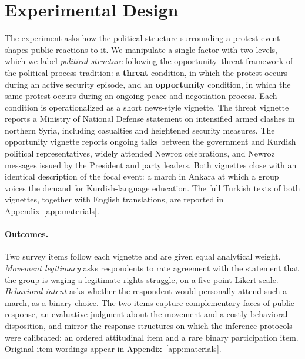 
\section{Experimental Design}
\label{sec:experiment}

The experiment asks how the political structure surrounding a protest event
shapes public reactions to it. We manipulate a single factor with two
levels, which we label \emph{political structure} following the
opportunity--threat framework of the political process tradition: a
\textbf{threat} condition, in which the protest occurs during an active
security episode, and an \textbf{opportunity} condition, in which the same
protest occurs during an ongoing peace and negotiation process. Each
condition is operationalized as a short news-style vignette. The threat
vignette reports a Ministry of National Defense statement on intensified
armed clashes in northern Syria, including casualties and heightened
security measures. The opportunity vignette reports ongoing talks between
the government and Kurdish political representatives, widely attended Newroz
celebrations, and Newroz messages issued by the President and party leaders.
Both vignettes close with an identical description of the focal event: a
march in Ankara at which a group voices the demand for Kurdish-language
education. The full Turkish texts of both vignettes, together with English
translations, are reported in Appendix~\ref{app:materials}.

\paragraph{Outcomes.} Two survey items follow each vignette and are given
equal analytical weight. \emph{Movement legitimacy} asks respondents to rate
agreement with the statement that the group is waging a legitimate rights
struggle, on a five-point Likert scale. \emph{Behavioral intent} asks
whether the respondent would personally attend such a march, as a binary
choice. The two items capture complementary faces of public response, an
evaluative judgment about the movement and a costly behavioral disposition,
and mirror the response structures on which the inference protocols were
calibrated: an ordered attitudinal item and a rare binary participation
item. Original item wordings appear in Appendix~\ref{app:materials}.

